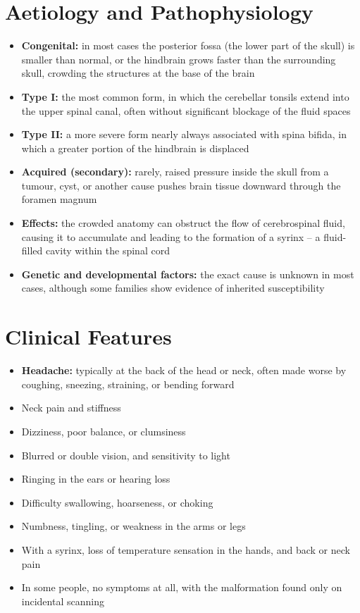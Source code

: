 \section*{Aetiology and Pathophysiology}
\begin{itemize}
    \item \textbf{Congenital:} in most cases the posterior fossa (the lower part of the skull) is smaller than normal, or the hindbrain grows faster than the surrounding skull, crowding the structures at the base of the brain
    \item \textbf{Type I:} the most common form, in which the cerebellar tonsils extend into the upper spinal canal, often without significant blockage of the fluid spaces
    \item \textbf{Type II:} a more severe form nearly always associated with spina bifida, in which a greater portion of the hindbrain is displaced
    \item \textbf{Acquired (secondary):} rarely, raised pressure inside the skull from a tumour, cyst, or another cause pushes brain tissue downward through the foramen magnum
    \item \textbf{Effects:} the crowded anatomy can obstruct the flow of cerebrospinal fluid, causing it to accumulate and leading to the formation of a syrinx -- a fluid-filled cavity within the spinal cord
    \item \textbf{Genetic and developmental factors:} the exact cause is unknown in most cases, although some families show evidence of inherited susceptibility
\end{itemize}

\section*{Clinical Features}
\begin{itemize}
    \item \textbf{Headache:} typically at the back of the head or neck, often made worse by coughing, sneezing, straining, or bending forward
    \item Neck pain and stiffness
    \item Dizziness, poor balance, or clumsiness
    \item Blurred or double vision, and sensitivity to light
    \item Ringing in the ears or hearing loss
    \item Difficulty swallowing, hoarseness, or choking
    \item Numbness, tingling, or weakness in the arms or legs
    \item With a syrinx, loss of temperature sensation in the hands, and back or neck pain
    \item In some people, no symptoms at all, with the malformation found only on incidental scanning
\end{itemize}

